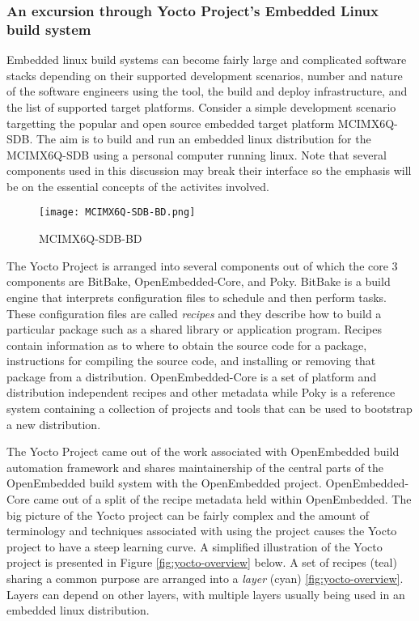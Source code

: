 \subsubsection{An excursion through Yocto Project's Embedded Linux build system}
\label{section:yocto-demo}

Embedded linux build systems can become fairly large and complicated software stacks depending on their supported development scenarios, number and nature of the software engineers using the tool, the build and deploy infrastructure, and the list of supported target platforms. Consider a simple development scenario targetting the popular and open source embedded target platform MCIMX6Q-SDB. The aim is to build and run an embedded linux distribution for the MCIMX6Q-SDB using a personal computer running linux. Note that several components used in this discussion may break their interface so the emphasis will be on the essential concepts of the activites involved.

\begin{figure}[h]
	\centering
	\texttt{[image: MCIMX6Q-SDB-BD.png]}
	\caption{MCIMX6Q-SDB-BD}
	\label{fig:mcimx6q-sdb}
\end{figure}

The Yocto Project is arranged into several components out of which the core 3 components are BitBake, OpenEmbedded-Core, and Poky. BitBake is a build engine that interprets configuration files to schedule and then perform tasks. These configuration files are called \textit{recipes} and they describe how to build a particular package such as a shared library or application program. Recipes contain information as to where to obtain the source code for a package, instructions for compiling the source code, and installing or removing that package from a distribution. OpenEmbedded-Core is a set of platform and distribution independent recipes and other metadata while Poky is a reference system containing a collection of projects and tools that can be used to bootstrap a new distribution.

The Yocto Project came out of the work associated with OpenEmbedded build automation framework and shares maintainership of the central parts of the OpenEmbedded build system with the OpenEmbedded project. OpenEmbedded-Core came out of a split of the recipe metadata held within OpenEmbedded. The big picture of the Yocto project can be fairly complex and the amount of terminology and techniques associated with using the project causes the Yocto project to have a steep learning curve. A simplified illustration of the Yocto project is presented in Figure \ref{fig:yocto-overview} below. A set of recipes (teal) sharing a common purpose are arranged into a \textit{layer} (cyan) \ref{fig:yocto-overview}. Layers can depend on other layers, with multiple layers usually being used in an embedded linux distribution.

